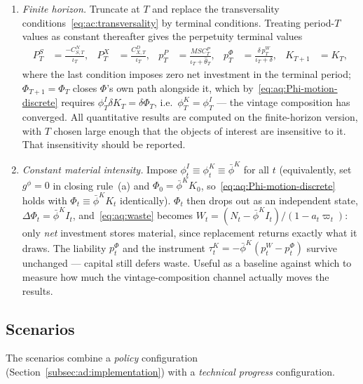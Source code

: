 \begin{enumerate}[label=\textbf{V\arabic*.},leftmargin=3.2em,itemsep=0.4em]
\item\label{var:aq:finite} \emph{Finite horizon.} Truncate at $T$ and replace the transversality conditions~\eqref{eq:ac:transversality} by terminal conditions. Treating period-$T$ values as constant thereafter gives the perpetuity terminal values
\begin{align}
P^S_T &= \frac{-C^N_{S,T}}{\iota_T},
&
P^X_T &= \frac{C^D_{X,T}}{\iota_T},
&
p^P_T &= \frac{MSC^P_T}{\iota_T+\widehat\theta_T},
&
p^\Phi_T &= \frac{\delta\,p^W_T}{\iota_T+\delta},
&
K_{T+1} &= K_T,
\label{eq:aq:terminal}
\end{align}
where the last condition imposes zero net investment in the terminal period; $\Phi_{T+1}=\Phi_T$ closes $\Phi$'s own path alongside it, which by~\eqref{eq:aq:Phi-motion-discrete} requires $\phi^I_T\delta K_T=\delta\Phi_T$, i.e.\ $\phi^K_T=\phi^I_T$ --- the vintage composition has converged. All quantitative results are computed on the finite-horizon version, with $T$ chosen large enough that the objects of interest are insensitive to it. That insensitivity should be reported.

\item\label{var:aq:constant-phi} \emph{Constant material intensity.} Impose $\phi^I_t\equiv\phi^K_t\equiv\bar\phi^K$ for all $t$ (equivalently, set $g^\phi=0$ in closing rule~(a) and $\Phi_0=\bar\phi^KK_0$, so~\eqref{eq:aq:Phi-motion-discrete} holds with $\Phi_t\equiv\bar\phi^KK_t$ identically). $\Phi_t$ then drops out as an independent state, $\Delta\Phi_t=\bar\phi^KI_t$, and~\eqref{eq:aq:waste} becomes $W_t=\left(N_t-\bar\phi^KI_t\right)/\left(1-a_t\varpi_t\right)$: only \emph{net} investment stores material, since replacement returns exactly what it draws. The liability $p^\Phi_t$ and the instrument $\tau^K_t=-\bar\phi^K\left(p^W_t-p^\Phi_t\right)$ survive unchanged --- capital still defers waste. Useful as a baseline against which to measure how much the vintage-composition channel actually moves the results.

\end{enumerate}

\subsection{Scenarios}
\label{subsec:aq:scenarios}

The scenarios combine a \emph{policy} configuration (Section~\ref{subsec:ad:implementation}) with a \emph{technical progress} configuration.

